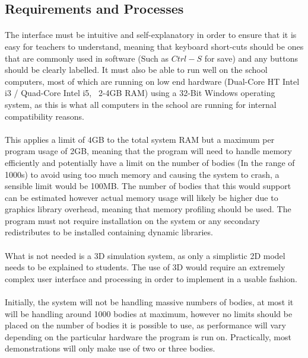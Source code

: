 \subsection{Requirements and Processes}
\paragraph{}
The interface must be intuitive and self-explanatory in order to ensure that it is easy for teachers to understand, meaning that keyboard short-cuts should be ones that are commonly used in software (Such as $Ctrl-S$ for save) and any buttons should be clearly labelled. It must also be able to run well on the school computers, most of which are running on low end hardware (Dual-Core HT Intel i3 / Quad-Core Intel i5, ~2-4GB RAM) using a 32-Bit Windows operating system, as this is what all computers in the school are running for internal compatibility reasons. 

\paragraph{}
This applies a limit of 4GB to the total system RAM but a maximum per program usage of 2GB, meaning that the program will need to handle memory efficiently and potentially have a limit on the number of bodies (In the range of 1000s) to avoid using too much memory and causing the system to crash, a sensible limit would be 100MB. The number of bodies that this would support can be estimated however actual memory usage will likely be higher due to graphics library overhead, meaning that memory profiling should be used. The program must not require installation on the system or any secondary redistributes to be installed containing dynamic libraries.

\paragraph{}
What is not needed is a 3D simulation system, as only a simplistic 2D model needs to be explained to students. The use of 3D would require an extremely complex user interface and processing in order to implement in a usable fashion.

\paragraph{}
Initially, the system will not be handling massive numbers of bodies, at most it will be handling around 1000 bodies at maximum, however no limits should be placed on the number of bodies it is possible to use, as performance will vary depending on the particular hardware the program is run on. Practically, most demonstrations will only make use of two or three bodies.

